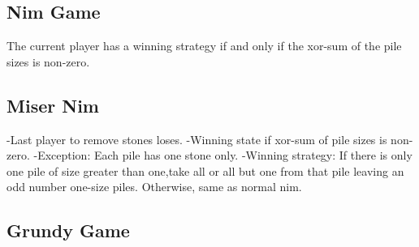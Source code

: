 \documentclass[10pt, a4paper,twocolumn]{article}
\begin{document}
\subsection{Nim Game}
The current player has a winning strategy if and only if the xor-sum of the pile sizes is non-zero.
\subsection{Miser Nim}
-Last player to remove stones loses.
-Winning state if xor-sum of pile sizes is non-zero.
-Exception: Each pile has one stone only.
-Winning strategy: If there is only one pile of size greater than one,take all or all but one from that pile leaving an odd number one-size piles. Otherwise, same as normal nim.
\subsection{Grundy Game}


\end{document}
